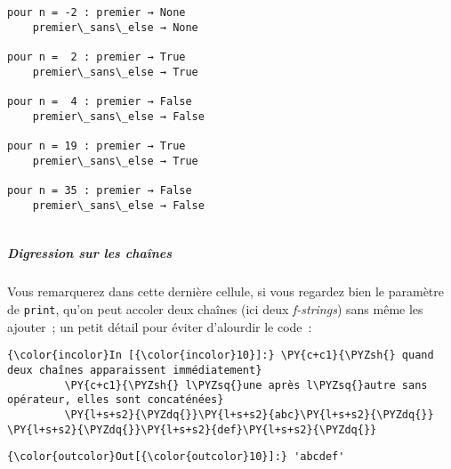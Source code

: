     \begin{Verbatim}[commandchars=\\\{\}]
pour n = -2 : premier → None
    premier\_sans\_else → None

pour n =  2 : premier → True
    premier\_sans\_else → True

pour n =  4 : premier → False
    premier\_sans\_else → False

pour n = 19 : premier → True
    premier\_sans\_else → True

pour n = 35 : premier → False
    premier\_sans\_else → False


    \end{Verbatim}

    \hypertarget{digression-sur-les-chauxeenes}{%
\subparagraph{Digression sur les
chaînes}\label{digression-sur-les-chauxeenes}}

    Vous remarquerez dans cette dernière cellule, si vous regardez bien le
paramètre de \texttt{print}, qu'on peut accoler deux chaînes (ici deux
\emph{f-strings}) sans même les ajouter~; un petit détail pour éviter
d'alourdir le code~:

    \begin{Verbatim}[commandchars=\\\{\}]
{\color{incolor}In [{\color{incolor}10}]:} \PY{c+c1}{\PYZsh{} quand deux chaînes apparaissent immédiatement}
         \PY{c+c1}{\PYZsh{} l\PYZsq{}une après l\PYZsq{}autre sans opérateur, elles sont concaténées}
         \PY{l+s+s2}{\PYZdq{}}\PY{l+s+s2}{abc}\PY{l+s+s2}{\PYZdq{}} \PY{l+s+s2}{\PYZdq{}}\PY{l+s+s2}{def}\PY{l+s+s2}{\PYZdq{}}
\end{Verbatim}


\begin{Verbatim}[commandchars=\\\{\}]
{\color{outcolor}Out[{\color{outcolor}10}]:} 'abcdef'
\end{Verbatim}
            

    
    
    
